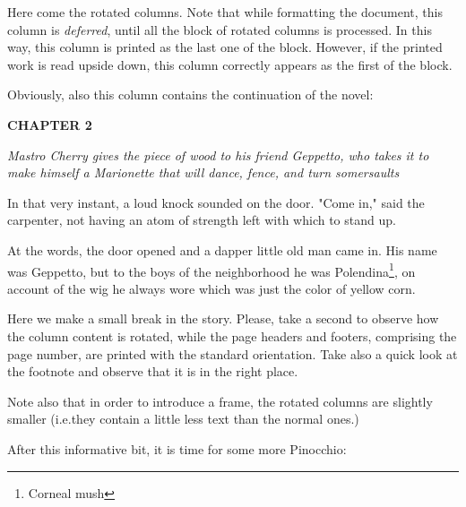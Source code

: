 \documentclass[12pt,twoside,twocolumn]{article}
\begin{document}
\rotboxpages%
Here come the rotated columns. Note that while formatting the
document, this column is \emph{deferred}, until all the block of rotated
columns is processed. In this way, this column is printed as the last one
of the block. However, if the printed work is read upside down, this
column correctly appears as the first of the block.

Obviously, also this column contains the continuation of the novel:

\bigskip
{\slshape%

  \textbf{CHAPTER 2}

  \emph{Mastro Cherry gives the piece of wood to his friend Geppetto,
    who takes it to make himself a Marionette that will dance,
    fence, and turn somersaults}
  \medskip
  
  In that very instant, a loud knock sounded on the door.
  "Come in," said the carpenter, not having an atom of
  strength left with which to stand up.
  
  At the words, the door opened and a dapper little old man came in.
  His name was Geppetto, but to the boys of the neighborhood he was
  Polendina\footnote{Corneal mush}, on account of the wig he always
  wore which was just the color of yellow corn.
  
}

\bigbreak

Here we make a small break in the story. Please, take a second to
observe how the column content is rotated, while the page headers and
footers, comprising the page number, are printed with the standard
orientation. Take also a quick look at the footnote and observe that
it is in the right place.

Note also that in order to introduce a frame, the rotated columns are
slightly smaller (i.e.\@ they contain a little less text than the
normal ones.)  

After this informative bit, it is time for some more Pinocchio:
\end{document}
